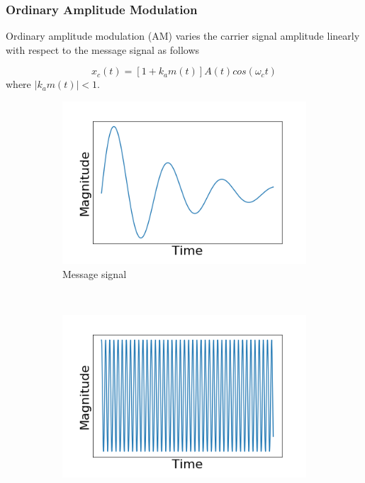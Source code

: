 \documentclass[]{article}
\begin{document}
\subsubsection{Ordinary Amplitude Modulation}
Ordinary amplitude modulation (AM) varies the carrier signal amplitude linearly with respect to the message signal as follows

\begin{equation} x_{c}(t) = [1 + k_{a}m(t)]A(t)cos(\omega_{c}t) \end{equation}
where $|k_{a}m(t)|<1$.

\begin{figure}[h!]
	\centering
	\begin{subfigure}[b]{0.3\textwidth}
		\includegraphics[width=\textwidth]{figs/amplitude_modulation/am/message_signal.png}
		\caption{Message signal}
		\label{fig:am_message_signal}
	\end{subfigure}
	~ %
	\begin{subfigure}[b]{0.3\textwidth}
		\includegraphics[width=\textwidth]{figs/amplitude_modulation/am/carrier_signal.png}

\end{subfigure}
\end{figure}
\end{document}

